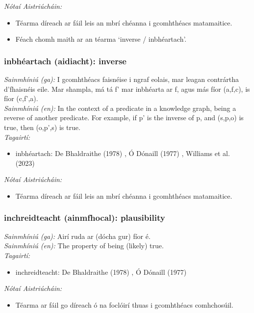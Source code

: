 \documentclass{article}
\begin{document}
 \noindent \textit{Nótaí Aistriúcháin:}
\begin{itemize}
	\item Téarma díreach ar fáil leis an mbrí chéanna i gcomhthéacs matamaitice.
	\item Féach chomh maith ar an téarma `inverse / inbhéartach'.
\end{itemize}


\subsubsection*{inbhéartach (aidiacht): inverse}
 \noindent \textit{Sainmhíniú (ga):} I gcomhthéacs faisnéise i ngraf eolais, mar leagan contrártha d'fhaisnéis eile. Mar shampla, má tá f' mar inbhéarta ar f, agus más fíor (a,f,c), is fíor (c,f',a).
\\
 \noindent \textit{Sainmhíniú (en):} In the context of a predicate in a knowledge graph, being a reverse of another predicate. For example, if p' is the inverse of p, and (s,p,o) is true, then (o,p',s) is true.
\\
 \noindent \textit{Tagairtí:}
\begin{itemize}
	\item inbhéartach: De Bhaldraithe (1978) \cite{de-bhaldraithe}, Ó Dónaill (1977) \cite{odonaill}, Williams et al. (2023) \cite{storchiste}
\end{itemize}

 \noindent \textit{Nótaí Aistriúcháin:}
\begin{itemize}
	\item Téarma díreach ar fáil leis an mbrí chéanna i gcomhthéacs matamaitice.
\end{itemize}


\subsubsection*{inchreidteacht (ainmfhocal): plausibility}
 \noindent \textit{Sainmhíniú (ga):} Airí ruda ar (dócha gur) fíor é.
\\
 \noindent \textit{Sainmhíniú (en):} The property of being (likely) true.
\\
 \noindent \textit{Tagairtí:}
\begin{itemize}
	\item inchreidteacht: De Bhaldraithe (1978) \cite{de-bhaldraithe}, Ó Dónaill (1977) \cite{odonaill}
\end{itemize}

 \noindent \textit{Nótaí Aistriúcháin:}
\begin{itemize}
	\item Téarma ar fáil go díreach ó na foclóirí thuas i gcomhthéacs comhchosúil.
\end{itemize}
\end{document}
